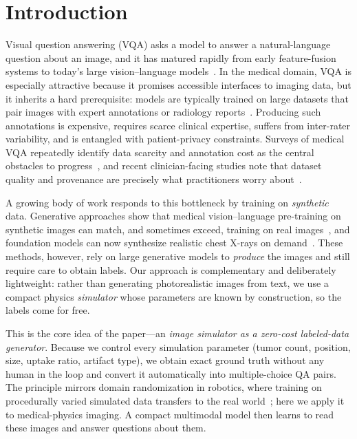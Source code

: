 \documentclass[11pt]{article}
\begin{document}
\section{Introduction}
\label{sec:intro}

Visual question answering (VQA) asks a model to answer a natural-language
question about an image, and it has matured rapidly from early feature-fusion
systems to today's large vision--language models~\cite{ishmam2025vqasurvey}. In
the medical domain, VQA is especially attractive because it promises accessible
interfaces to imaging data, but it inherits a hard prerequisite: models are
typically trained on large datasets that pair images with expert annotations or
radiology reports~\cite{lin2023medvqasurvey}. Producing such annotations is
expensive, requires scarce clinical expertise, suffers from inter-rater
variability, and is entangled with patient-privacy constraints. Surveys of
medical VQA repeatedly identify data scarcity and annotation cost as the central
obstacles to progress~\cite{lin2023medvqasurvey}, and recent clinician-facing
studies note that dataset quality and provenance are precisely what practitioners
worry about~\cite{jin2025medvqabarriers}.

A growing body of work responds to this bottleneck by training on
\emph{synthetic} data. Generative approaches show that medical vision--language
pre-training on synthetic images can match, and sometimes exceed, training on
real images~\cite{hu2023medvlpsynthetic,liu2024medvlppurelysynthetic}, and
foundation models can now synthesize realistic chest X-rays on
demand~\cite{bluethgen2024chestxray}. These methods, however, rely on large
generative models to \emph{produce} the images and still require care to obtain
labels. Our approach is complementary and deliberately lightweight: rather than
generating photorealistic images from text, we use a compact physics
\emph{simulator} whose parameters are known by construction, so the labels come
for free.

This is the core idea of the paper---an \emph{image simulator as a zero-cost
labeled-data generator}. Because we control every simulation parameter (tumor
count, position, size, uptake ratio, artifact type), we obtain exact ground truth
without any human in the loop and convert it automatically into multiple-choice
QA pairs. The principle mirrors domain randomization in robotics, where training
on procedurally varied simulated data transfers to the real
world~\cite{tobin2017domainrand}; here we apply it to medical-physics imaging. A
compact multimodal model then learns to read these images and answer questions
about them.
\end{document}
